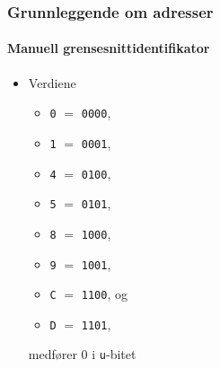\begin{frame}%
  \frametitle{Grunnleggende om adresser}
  \framesubtitle{Manuell grensesnittidentifikator}
  \begin{itemize}%
  \item Verdiene
    \begin{itemize}%
    \item \texttt{0} \(=\) \texttt{00\alert{0}0},
    \item \texttt{1} \(=\) \texttt{00\alert{0}1},
    \item \texttt{4} \(=\) \texttt{01\alert{0}0},
    \item \texttt{5} \(=\) \texttt{01\alert{0}1},
    \item \texttt{8} \(=\) \texttt{10\alert{0}0},
    \item \texttt{9} \(=\) \texttt{10\alert{0}1},
    \item \texttt{C} \(=\) \texttt{11\alert{0}0}, og
    \item \texttt{D} \(=\) \texttt{11\alert{0}1},
    \end{itemize}
    medfører \(0\) i \texttt{u}-bitet
  \end{itemize}
\end{frame}

